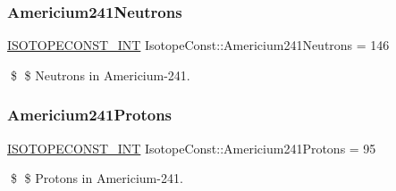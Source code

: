 \subsubsection{\texorpdfstring{Americium241\+Neutrons}{Americium241Neutrons}}
{\footnotesize\ttfamily \mbox{\hyperlink{group___isotope_const-_macros_ga5f18360b3e99483a35c32d789e62621c}{I\+S\+O\+T\+O\+P\+E\+C\+O\+N\+S\+T\+\_\+\+I\+NT}} Isotope\+Const\+::\+Americium241\+Neutrons = 146}

\$ \$ Neutrons in Americium-\/241. \mbox{\label{group___isotope_const-_americium-_am241_ga26859e4ef3d29fc3cdbf6ca12315d563}} 
\subsubsection{\texorpdfstring{Americium241\+Protons}{Americium241Protons}}
{\footnotesize\ttfamily \mbox{\hyperlink{group___isotope_const-_macros_ga5f18360b3e99483a35c32d789e62621c}{I\+S\+O\+T\+O\+P\+E\+C\+O\+N\+S\+T\+\_\+\+I\+NT}} Isotope\+Const\+::\+Americium241\+Protons = 95}

\$ \$ Protons in Americium-\/241. 